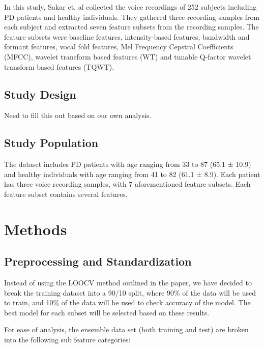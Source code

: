 \documentclass[
]{article}
\begin{document}
In this study, Sakar et. al collected the voice recordings of 252 subjects including PD patients and healthy individuals. They gathered three recording samples from each subject and extracted seven feature subsets from the recording samples. The feature subsets were baseline features, intensity-based features, bandwidth and formant features, vocal fold features, Mel Frequency Cepstral Coefficients (MFCC), wavelet transform based features (WT) and tunable Q-factor wavelet transform based features (TQWT).

\hypertarget{study-design}{%
\subsection{Study Design}\label{study-design}}

Need to fill this out based on our own analysis.

\hypertarget{study-population}{%
\subsection{Study Population}\label{study-population}}

The dataset includes PD patients with age ranging from 33 to 87 (65.1 ± 10.9) and healthy individuals with age
ranging from 41 to 82 (61.1 ± 8.9). Each patient has three voice recording samples, with 7 aforementioned
feature subsets. Each feature subset contains several features.

\hypertarget{methods}{%
\section{Methods}\label{methods}}

\hypertarget{preprocessing-and-standardization}{%
\subsection{Preprocessing and Standardization}\label{preprocessing-and-standardization}}

Instead of using the LOOCV method outlined in the paper, we have decided to break the training dataset into a 90/10 split, where 90\% of the data will be used to train, and 10\% of the data will be used to check accuracy of the model. The best model for each subset will be selected based on these results.

For ease of analysis, the ensemble data set (both training and test) are broken into the following sub feature categories:
\end{document}
